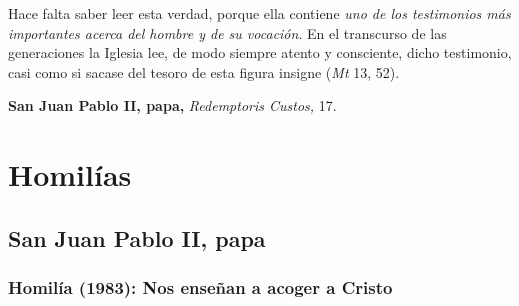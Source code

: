				Hace falta saber leer esta verdad, porque ella contiene \emph{uno de los testimonios más importantes acerca del hombre y de su vocación}. En el transcurso de las generaciones la Iglesia lee, de modo siempre atento y consciente, dicho testimonio, casi como si sacase del tesoro de esta figura insigne  (\emph{Mt} 13, 52).

\textbf{San Juan Pablo II, papa,} \emph{Redemptoris Custos,} 17.


	\newsection
	
	\section{Homilías}

		\subsection{San Juan Pablo II, papa}

			\subsubsection{Homilía (1983): Nos enseñan a acoger a Cristo}

				
